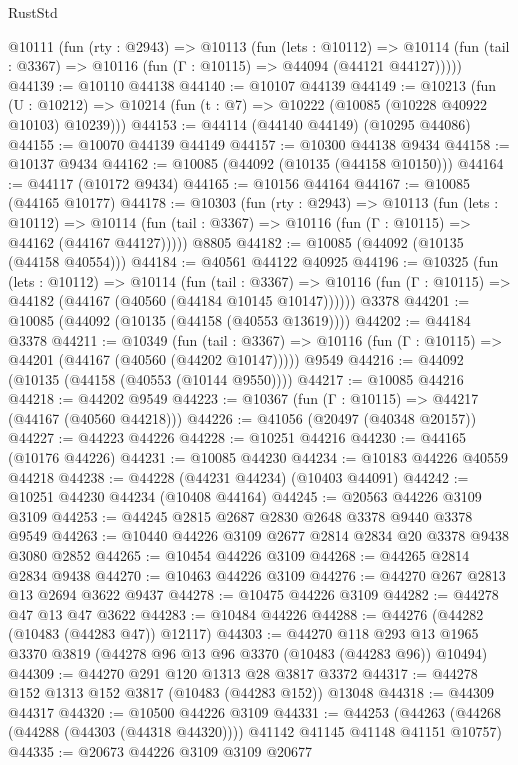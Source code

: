 \begin{lexlean}{RustStd}
\begin{coremodule}
  @10111
    (fun (rty : @2943) =>
    @10113
      (fun (lets : @10112) =>
      @10114 (fun (tail : @3367) => @10116 (fun (Γ : @10115) => @44094 (@44121 @44127)))))
@44139 := @10110 @44138
@44140 := @10107 @44139
@44149 := @10213
    (fun (U : @10212) => @10214 (fun (t : @7) => @10222 (@10085 (@10228 @40922 @10103) @10239)))
@44153 := @44114 (@44140 @44149) (@10295 @44086)
@44155 := @10070 @44139 @44149
@44157 := @10300 @44138 @9434
@44158 := @10137 @9434
@44162 := @10085 (@44092 (@10135 (@44158 @10150)))
@44164 := @44117 (@10172 @9434)
@44165 := @10156 @44164
@44167 := @10085 (@44165 @10177)
@44178 := @10303
    (fun (rty : @2943) =>
    @10113
      (fun (lets : @10112) =>
      @10114 (fun (tail : @3367) => @10116 (fun (Γ : @10115) => @44162 (@44167 @44127)))))
    @8805
@44182 := @10085 (@44092 (@10135 (@44158 @40554)))
@44184 := @40561 @44122 @40925
@44196 := @10325
    (fun (lets : @10112) =>
    @10114
      (fun (tail : @3367) =>
      @10116 (fun (Γ : @10115) => @44182 (@44167 (@40560 (@44184 @10145 @10147))))))
    @3378
@44201 := @10085 (@44092 (@10135 (@44158 (@40553 @13619))))
@44202 := @44184 @3378
@44211 := @10349
    (fun (tail : @3367) => @10116 (fun (Γ : @10115) => @44201 (@44167 (@40560 (@44202 @10147)))))
    @9549
@44216 := @44092 (@10135 (@44158 (@40553 (@10144 @9550))))
@44217 := @10085 @44216
@44218 := @44202 @9549
@44223 := @10367 (fun (Γ : @10115) => @44217 (@44167 (@40560 @44218)))
@44226 := @41056 (@20497 (@40348 @20157))
@44227 := @44223 @44226
@44228 := @10251 @44216
@44230 := @44165 (@10176 @44226)
@44231 := @10085 @44230
@44234 := @10183 @44226 @40559 @44218
@44238 := @44228 (@44231 @44234) (@10403 @44091)
@44242 := @10251 @44230 @44234 (@10408 @44164)
@44245 := @20563 @44226 @3109 @3109
@44253 := @44245 @2815 @2687 @2830 @2648 @3378 @9440 @3378 @9549
@44263 := @10440 @44226 @3109 @2677 @2814 @2834 @20 @3378 @9438 @3080 @2852
@44265 := @10454 @44226 @3109
@44268 := @44265 @2814 @2834 @9438
@44270 := @10463 @44226 @3109
@44276 := @44270 @267 @2813 @13 @2694 @3622 @9437
@44278 := @10475 @44226 @3109
@44282 := @44278 @47 @13 @47 @3622
@44283 := @10484 @44226
@44288 := @44276 (@44282 (@10483 (@44283 @47)) @12117)
@44303 := @44270
    @118
    @293
    @13
    @1965
    @3370
    @3819
    (@44278 @96 @13 @96 @3370 (@10483 (@44283 @96)) @10494)
@44309 := @44270 @291 @120 @1313 @28 @3817 @3372
@44317 := @44278 @152 @1313 @152 @3817 (@10483 (@44283 @152)) @13048
@44318 := @44309 @44317
@44320 := @10500 @44226 @3109
@44331 := @44253
    (@44263 (@44268 (@44288 (@44303 (@44318 @44320)))) @41142 @41145 @41148 @41151 @10757)
@44335 := @20673 @44226 @3109 @3109 @20677

\end{coremodule}
\end{lexlean}
